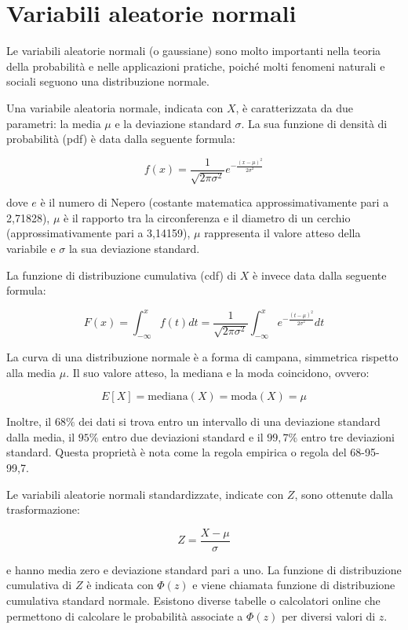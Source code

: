 \section{Variabili aleatorie normali}
Le variabili aleatorie normali (o gaussiane) sono molto importanti nella teoria della probabilità e nelle applicazioni pratiche, poiché molti fenomeni naturali e sociali seguono una distribuzione normale. 

Una variabile aleatoria normale, indicata con $X$, è caratterizzata da due parametri: la media $\mu$ e la deviazione standard $\sigma$. La sua funzione di densità di probabilità (pdf) è data dalla seguente formula:

$$f(x) = \frac{1}{\sqrt{2\pi\sigma^2}}e^{-\frac{(x-\mu)^2}{2\sigma^2}}$$

dove $e$ è il numero di Nepero (costante matematica approssimativamente pari a 2,71828), $\mu$ è il rapporto tra la circonferenza e il diametro di un cerchio (approssimativamente pari a 3,14159), $\mu$ rappresenta il valore atteso della variabile e $\sigma$ la sua deviazione standard.

La funzione di distribuzione cumulativa (cdf) di $X$ è invece data dalla seguente formula:

$$F(x) = \int_{-\infty}^x f(t) dt = \frac{1}{\sqrt{2\pi\sigma^2}} \int_{-\infty}^x e^{-\frac{(t-\mu)^2}{2\sigma^2}} dt$$

La curva di una distribuzione normale è a forma di campana, simmetrica rispetto alla media $\mu$. Il suo valore atteso, la mediana e la moda coincidono, ovvero:

$$E[X] = \mathrm{mediana}(X) = \mathrm{moda}(X) = \mu$$

Inoltre, il $68\%$ dei dati si trova entro un intervallo di una deviazione standard dalla media, il $95\%$ entro due deviazioni standard e il $99,7\%$ entro tre deviazioni standard. Questa proprietà è nota come la regola empirica o regola del 68-95-99,7.

Le variabili aleatorie normali standardizzate, indicate con $Z$, sono ottenute dalla trasformazione:

$$Z = \frac{X-\mu}{\sigma}$$

e hanno media zero e deviazione standard pari a uno. La funzione di distribuzione cumulativa di $Z$ è indicata con $\Phi(z)$ e viene chiamata funzione di distribuzione cumulativa standard normale. Esistono diverse tabelle o calcolatori online che permettono di calcolare le probabilità associate a $\Phi(z)$ per diversi valori di $z$.

